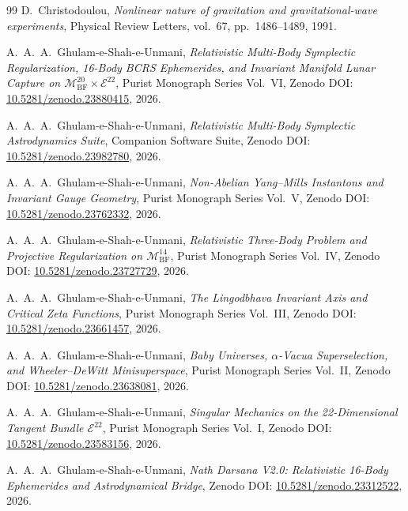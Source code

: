 \documentclass[11pt,a4paper,reqno]{article}
\theoremstyle{plain}
\theoremstyle{definition}
\theoremstyle{remark}
\numberwithin{equation}{section}
\numberwithin{table}{section}
\newcommand{\MbfTwenty}{\mathcal{M}_{\mathrm{BF}}^{20}}
\newcommand{\Ebundle}{\mathcal{E}^{22}}
\begin{document}
\begin{thebibliography}{99}
D.~Christodoulou, \emph{Nonlinear nature of gravitation and gravitational-wave experiments}, Physical Review Letters, vol.~67, pp.~1486--1489, 1991.

A.~A.~A.~Ghulam-e-Shah-e-Unmani, \emph{Relativistic Multi-Body Symplectic Regularization, 16-Body BCRS Ephemerides, and Invariant Manifold Lunar Capture on $\MbfTwenty \times \Ebundle$}, Purist Monograph Series Vol.~VI, Zenodo DOI: \href{https://doi.org/10.5281/zenodo.23880415}{10.5281/zenodo.23880415}, 2026.

A.~A.~A.~Ghulam-e-Shah-e-Unmani, \emph{Relativistic Multi-Body Symplectic Astrodynamics Suite}, Companion Software Suite, Zenodo DOI: \href{https://doi.org/10.5281/zenodo.23982780}{10.5281/zenodo.23982780}, 2026.

A.~A.~A.~Ghulam-e-Shah-e-Unmani, \emph{Non-Abelian Yang--Mills Instantons and Invariant Gauge Geometry}, Purist Monograph Series Vol.~V, Zenodo DOI: \href{https://doi.org/10.5281/zenodo.23762332}{10.5281/zenodo.23762332}, 2026.

A.~A.~A.~Ghulam-e-Shah-e-Unmani, \emph{Relativistic Three-Body Problem and Projective Regularization on $\mathcal{M}_{\mathrm{BF}}^{14}$}, Purist Monograph Series Vol.~IV, Zenodo DOI: \href{https://doi.org/10.5281/zenodo.23727729}{10.5281/zenodo.23727729}, 2026.

A.~A.~A.~Ghulam-e-Shah-e-Unmani, \emph{The Lingodbhava Invariant Axis and Critical Zeta Functions}, Purist Monograph Series Vol.~III, Zenodo DOI: \href{https://doi.org/10.5281/zenodo.23661457}{10.5281/zenodo.23661457}, 2026.

A.~A.~A.~Ghulam-e-Shah-e-Unmani, \emph{Baby Universes, $\alpha$-Vacua Superselection, and Wheeler--DeWitt Minisuperspace}, Purist Monograph Series Vol.~II, Zenodo DOI: \href{https://doi.org/10.5281/zenodo.23638081}{10.5281/zenodo.23638081}, 2026.

A.~A.~A.~Ghulam-e-Shah-e-Unmani, \emph{Singular Mechanics on the 22-Dimensional Tangent Bundle $\mathcal{E}^{22}$}, Purist Monograph Series Vol.~I, Zenodo DOI: \href{https://doi.org/10.5281/zenodo.23583156}{10.5281/zenodo.23583156}, 2026.

A.~A.~A.~Ghulam-e-Shah-e-Unmani, \emph{Nath Darsana V2.0: Relativistic 16-Body Ephemerides and Astrodynamical Bridge}, Zenodo DOI: \href{https://doi.org/10.5281/zenodo.23312522}{10.5281/zenodo.23312522}, 2026.


\end{thebibliography}
\end{document}
